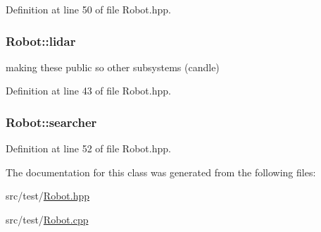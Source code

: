 Definition at line 50 of file Robot.\-hpp.

\hypertarget{classRobot_a222e54f477e23f5af80cfa10bcd85e7a}{
\subsubsection[{lidar}]{ Robot\-::lidar}}\label{classRobot_a222e54f477e23f5af80cfa10bcd85e7a}
making these public so other subsystems (candle) 

Definition at line 43 of file Robot.\-hpp.

\hypertarget{classRobot_af0ba30c47b84dc976f5bb7bd978f95ef}{
\subsubsection[{searcher}]{ Robot\-::searcher\hspace{0.3cm}{\ttfamily [private]}}}\label{classRobot_af0ba30c47b84dc976f5bb7bd978f95ef}


Definition at line 52 of file Robot.\-hpp.



The documentation for this class was generated from the following files\-:\begin{DoxyCompactItemize}
\item 
src/test/\hyperlink{Robot_8hpp}{Robot.\-hpp}\item 
src/test/\hyperlink{Robot_8cpp}{Robot.\-cpp}\end{DoxyCompactItemize}
